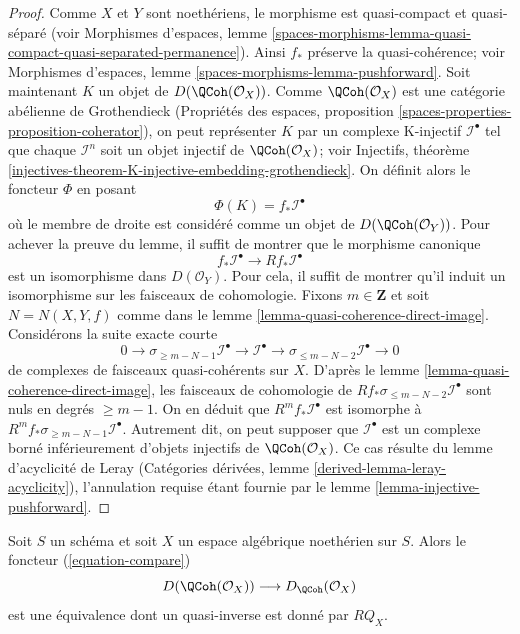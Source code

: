 \begin{proof}
Comme $X$ et $Y$ sont noeth\'eriens, le morphisme est quasi-compact et
quasi-s\'epar\'e (voir Morphismes d'espaces, lemme
\ref{spaces-morphisms-lemma-quasi-compact-quasi-separated-permanence}).
Ainsi $f_*$ pr\'eserve la quasi-coh\'erence; voir Morphismes d'espaces,
lemme \ref{spaces-morphisms-lemma-pushforward}.
Soit maintenant $K$ un objet de $D(\QCoh(\mathcal{O}_X))$.
Comme $\QCoh(\mathcal{O}_X)$ est une cat\'egorie ab\'elienne de Grothendieck
(Propri\'et\'es des espaces, proposition
\ref{spaces-properties-proposition-coherator}), on peut repr\'esenter $K$
par un complexe K-injectif $\mathcal{I}^\bullet$ tel que chaque
$\mathcal{I}^n$ soit un objet injectif de $\QCoh(\mathcal{O}_X)$; voir
Injectifs, th\'eor\`eme
\ref{injectives-theorem-K-injective-embedding-grothendieck}.
On d\'efinit alors le foncteur $\Phi$ en posant
$$
\Phi(K) = f_*\mathcal{I}^\bullet
$$
o\`u le membre de droite est consid\'er\'e comme un objet de
$D(\QCoh(\mathcal{O}_Y))$. Pour achever la preuve du lemme, il suffit de
montrer que le morphisme canonique
$$
f_*\mathcal{I}^\bullet \longrightarrow Rf_*\mathcal{I}^\bullet
$$
est un isomorphisme dans $D(\mathcal{O}_Y)$. Pour cela, il suffit de montrer
qu'il induit un isomorphisme sur les faisceaux de cohomologie. Fixons
$m \in \mathbf{Z}$ et soit $N = N(X, Y, f)$ comme dans le lemme
\ref{lemma-quasi-coherence-direct-image}. Consid\'erons la suite exacte courte
$$
0 \to \sigma_{\geq m - N - 1}\mathcal{I}^\bullet \to
\mathcal{I}^\bullet \to \sigma_{\leq m - N - 2}\mathcal{I}^\bullet \to 0
$$
de complexes de faisceaux quasi-coh\'erents sur $X$. D'apr\`es le lemme
\ref{lemma-quasi-coherence-direct-image}, les faisceaux de cohomologie de
$Rf_*\sigma_{\leq m - N - 2}\mathcal{I}^\bullet$
sont nuls en degr\'es $\geq m - 1$. On en d\'eduit que
$R^mf_*\mathcal{I}^\bullet$ est isomorphe \`a
$R^mf_*\sigma_{\geq m - N - 1}\mathcal{I}^\bullet$.
Autrement dit, on peut supposer que $\mathcal{I}^\bullet$ est un complexe
born\'e inf\'erieurement d'objets injectifs de $\QCoh(\mathcal{O}_X)$.
Ce cas r\'esulte du lemme d'acyclicit\'e de Leray (Cat\'egories d\'eriv\'ees,
lemme \ref{derived-lemma-leray-acyclicity}), l'annulation requise \'etant
fournie par le lemme \ref{lemma-injective-pushforward}.
\end{proof}

\begin{proposition}
\label{proposition-Noetherian}
Soit $S$ un sch\'ema et soit $X$ un espace alg\'ebrique noeth\'erien sur $S$.
Alors le foncteur (\ref{equation-compare})
$$
D(\QCoh(\mathcal{O}_X))
\longrightarrow
D_\QCoh(\mathcal{O}_X)
$$
est une \'equivalence dont un quasi-inverse est donn\'e par $RQ_X$.
\end{proposition}

